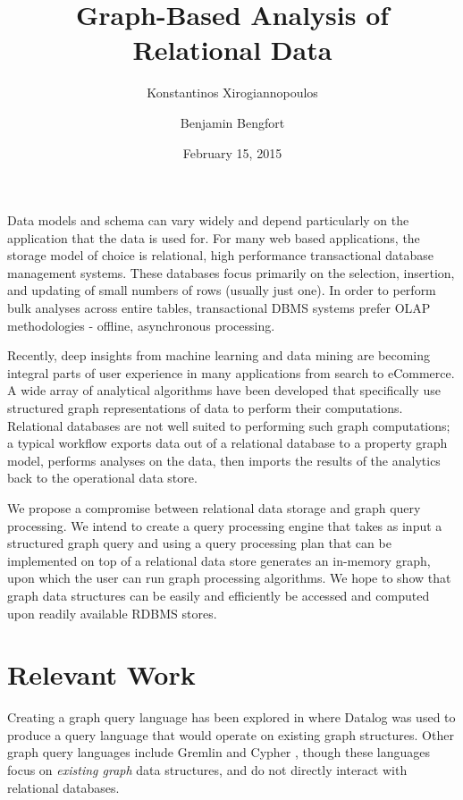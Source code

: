 \documentclass[12pt]{article}
\begin{document}
\title{Graph-Based Analysis of Relational Data}
\date{February 15, 2015}
\author[ ]{Konstantinos Xirogiannopoulos}
\author[ ]{Benjamin Bengfort}
\maketitle

Data models and schema can vary widely and depend particularly on the application that the data is used for. For many web based applications, the storage model of choice is relational, high performance transactional database management systems. These databases focus primarily on the selection, insertion, and updating of small numbers of rows (usually just one). In order to perform bulk analyses across entire tables, transactional DBMS systems prefer OLAP methodologies - offline, asynchronous processing. 

Recently, deep insights from machine learning and data mining are becoming integral parts of user experience in many applications from search to eCommerce. A wide array of analytical algorithms have been developed that specifically use structured graph representations of data to perform their computations. Relational databases are not well suited to performing such graph computations; a typical workflow exports data out of a relational database to a property graph model, performs analyses on the data, then imports the results of the analytics back to the operational data store.

We propose a compromise between relational data storage and graph query processing. We intend to create a query processing engine that takes as input a structured graph query and using a query processing plan that can be implemented on top of a relational data store generates an in-memory graph, upon which the user can run graph processing algorithms. We hope to show that graph data structures can be easily and efficiently be accessed and computed upon readily available RDBMS stores.

\section*{Relevant Work}

Creating a graph query language has been explored in \cite{he_graphs-at--time_2008} where Datalog was used to produce a query language that would operate on existing graph structures. Other graph query languages include Gremlin \cite{rodriguez_gremlin_2013} and Cypher \cite{miller_graph_2013}, though these languages focus on \textit{existing graph} data structures, and do not directly interact with relational databases. 
\end{document}
